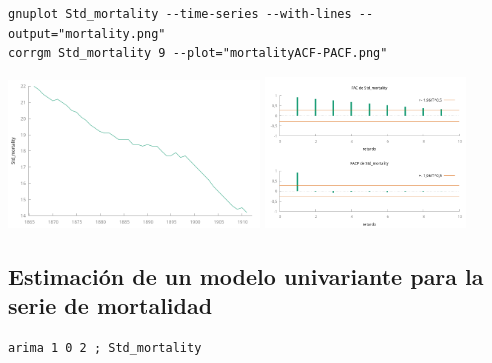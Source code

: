 \documentclass[10pt]{article}
\begin{document}
\begin{verbatim}
gnuplot Std_mortality --time-series --with-lines --output="mortality.png"
corrgm Std_mortality 9 --plot="mortalityACF-PACF.png"
\end{verbatim}


\begin{center}
\includegraphics[width=0.5\textwidth]{./mortality-marriages/mortality.png} 
\includegraphics[width=0.4\textwidth]{./mortality-marriages/mortalityACF-PACF.png} 
\end{center}
\subsection*{Estimación de un modelo univariante para la serie de mortalidad}
\label{sec:orgc79bead}

\begin{verbatim}
arima 1 0 2 ; Std_mortality
\end{verbatim}
\end{document}
